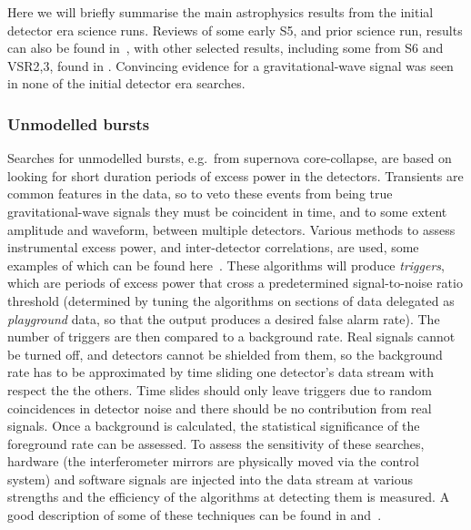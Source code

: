 Here we will briefly summarise the main astrophysics results from the initial detector era science runs.
Reviews of some early S5, and prior science run, results can also be found in~\cite{Papa:2008,
Fairhurst:2009}, with other selected results, including some from S6 and VSR2,3, found in 
\cite{2014GReGr..46.1763B}. Convincing evidence for a gravitational-wave signal was seen in none of the 
initial detector era searches.


\subsubsection{Unmodelled bursts}
\label{subsubsection:unmodelled} 

Searches for unmodelled bursts, e.g.\ from supernova core-collapse, are based on looking for short duration 
periods of excess power in the detectors. Transients are common features in the data, so to veto these events 
from being true gravitational-wave signals they must be coincident in time, and to some extent amplitude and
waveform, between multiple detectors. Various methods to assess instrumental excess power, and inter-detector 
correlations, are used, some examples of which can be found here~\cite{Klimenko:2004, Anderson:2001, 
Searle:2008, McNabb:2004, Cadonati:2004, Chatterji:2004, Chatterji:2006}. These algorithms will produce
\textit{triggers}, which are periods of excess power that cross a predetermined signal-to-noise ratio 
threshold (determined by tuning the algorithms on sections of data delegated as \textit{playground} data, so 
that the output produces a desired false alarm rate). The number of triggers are then compared to a 
background rate. Real signals cannot be turned off, and detectors cannot be shielded from them, so the
background rate has to be approximated by time sliding one detector's data stream with respect the the 
others. Time slides should only leave triggers due to random coincidences in detector noise and there should 
be no contribution from real signals. Once a background is calculated, the statistical significance of the foreground 
rate can be assessed. To assess the sensitivity of these searches, hardware (the interferometer mirrors 
are physically moved via the control system) and software signals are injected into the data stream at
various strengths and the efficiency of the algorithms at detecting them is measured. A good description of 
some of these techniques can be found in \cite{Abbott:2004b} and~\cite{Abbott:2006a}.


